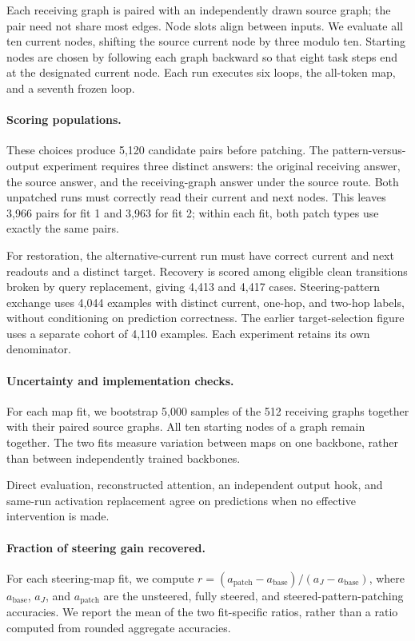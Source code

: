 \documentclass{article}
\begin{document}
Each receiving graph is paired with an independently drawn source graph; the pair need not share most edges. Node slots align between inputs. We evaluate all ten current nodes, shifting the source current node by three modulo ten. Starting nodes are chosen by following each graph backward so that eight task steps end at the designated current node. Each run executes six loops, the all-token map, and a seventh frozen loop.

\paragraph{Scoring populations.}
These choices produce 5,120 candidate pairs before patching. The pattern-versus-output experiment requires three distinct answers: the original receiving answer, the source answer, and the receiving-graph answer under the source route. Both unpatched runs must correctly read their current and next nodes. This leaves 3,966 pairs for fit 1 and 3,963 for fit 2; within each fit, both patch types use exactly the same pairs.

For restoration, the alternative-current run must have correct current and next readouts and a distinct target. Recovery is scored among eligible clean transitions broken by query replacement, giving 4,413 and 4,417 cases. Steering-pattern exchange uses 4,044 examples with distinct current, one-hop, and two-hop labels, without conditioning on prediction correctness. The earlier target-selection figure uses a separate cohort of 4,110 examples. Each experiment retains its own denominator.

\paragraph{Uncertainty and implementation checks.}
For each map fit, we bootstrap 5,000 samples of the 512 receiving graphs together with their paired source graphs. All ten starting nodes of a graph remain together. The two fits measure variation between maps on one backbone, rather than between independently trained backbones.

Direct evaluation, reconstructed attention, an independent output hook, and same-run activation replacement agree on predictions when no effective intervention is made.

\paragraph{Fraction of steering gain recovered.}
For each steering-map fit, we compute $r=(a_{\mathrm{patch}}-a_{\mathrm{base}})/(a_J-a_{\mathrm{base}})$, where $a_{\mathrm{base}}$, $a_J$, and $a_{\mathrm{patch}}$ are the unsteered, fully steered, and steered-pattern-patching accuracies. We report the mean of the two fit-specific ratios, rather than a ratio computed from rounded aggregate accuracies.
\end{document}
